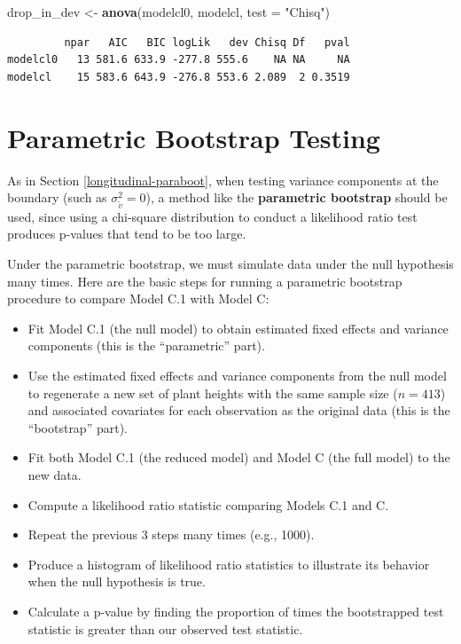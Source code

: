 \documentclass[
]{krantz}
\newenvironment{Shaded}{\begin{snugshade}}{\end{snugshade}}
\newcommand{\DataTypeTok}[1]{\textcolor[rgb]{0.27,0.27,0.27}{#1}}
\newcommand{\KeywordTok}[1]{\textcolor[rgb]{0.27,0.27,0.27}{\textbf{#1}}}
\newcommand{\NormalTok}[1]{#1}
\newcommand{\StringTok}[1]{\textcolor[rgb]{0.5,0.5,0.5}{#1}}
\providecommand{\tightlist}{%
  \setlength{\itemsep}{0pt}\setlength{\parskip}{0pt}}
\begin{document}
\begin{Shaded}
\begin{Highlighting}[]
\NormalTok{drop_in_dev <-}\StringTok{ }\KeywordTok{anova}\NormalTok{(modelcl0, modelcl, }\DataTypeTok{test =} \StringTok{"Chisq"}\NormalTok{)}
\end{Highlighting}
\end{Shaded}

\begin{verbatim}
         npar   AIC   BIC logLik   dev Chisq Df   pval
modelcl0   13 581.6 633.9 -277.8 555.6    NA NA     NA
modelcl    15 583.6 643.9 -276.8 553.6 2.089  2 0.3519
\end{verbatim}

\hypertarget{threelevel-paraboot}{%
\section{Parametric Bootstrap Testing}\label{threelevel-paraboot}}

As in Section \ref{longitudinal-paraboot}, when testing variance components at the boundary (such as \(\sigma_{\tilde{v}}^{2} = 0\)), a method like the \textbf{parametric bootstrap}  should be used, since using a chi-square distribution to conduct a likelihood ratio test produces p-values that tend to be too large.

Under the parametric bootstrap, we must simulate data under the null hypothesis many times. Here are the basic steps for running a parametric bootstrap procedure to compare Model C.1 with Model C:

\begin{itemize}
\tightlist
\item
  Fit Model C.1 (the null model) to obtain estimated fixed effects and variance components (this is the ``parametric'' part).
\item
  Use the estimated fixed effects and variance components from the null model to regenerate a new set of plant heights with the same sample size (\(n=413\)) and associated covariates for each observation as the original data (this is the ``bootstrap'' part).
\item
  Fit both Model C.1 (the reduced model) and Model C (the full model) to the new data.
\item
  Compute a likelihood ratio statistic comparing Models C.1 and C.
\item
  Repeat the previous 3 steps many times (e.g., 1000).
\item
  Produce a histogram of likelihood ratio statistics to illustrate its behavior when the null hypothesis is true.
\item
  Calculate a p-value by finding the proportion of times the bootstrapped test statistic is greater than our observed test statistic.
\end{itemize}
\end{document}
